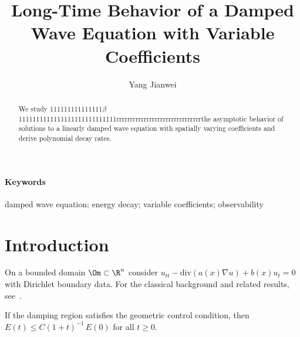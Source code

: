 





























\title{Long-Time Behavior of a Damped Wave Equation with Variable Coefficients}
\author{Yang Jianwei}
\date{}

\maketitle
\ifdefined\YTfallback
\noindent{}
\bigskip
\fi
\begin{abstract}
We study 111111111111111$\beta$ 1111111111111111111111111111rrrrrrrrrrrrrrrrrrrrrrrrrrrrrrrthe asymptotic behavior of solutions to a linearly damped wave equation with spatially varying coefficients and derive polynomial decay rates.
\end{abstract}
\paragraph{Keywords} damped wave equation; energy decay; variable coefficients; observability

\section{Introduction}
On a bounded domain $\Om\subset\R^n$ consider $u_{tt}-\mathrm{div}(a(x)\nabla u)+b(x)u_t=0$ with Dirichlet boundary data.
For the classical background and related results, see~\cite{Evans,Brezis}.

\begin{theorem}
If the damping region satisfies the geometric control condition, then $E(t)\le C(1+t)^{-1}\,E(0)$ for all $t\ge0$.
\end{theorem}

